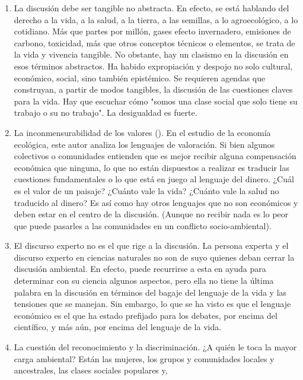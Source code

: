 \documentclass[
    a4paper,%
    DIV=calc,%
    abstract=true%
  ]{scrartcl}%
\begin{document}
  \begin{enumerate}
  \def\labelenumi{\arabic{enumi}.}
  \item
    La discusión debe ser tangible no abstracta. En efecto, se está
    hablando del derecho a la vida, a la salud, a la tierra, a las
    semillas, a lo agroecológico, a lo cotidiano. Más que partes por
    millón, gases efecto invernadero, emisiones de carbono, toxicidad,
    más que otros conceptos técnicos o elementos, se trata de la vida y
    vivencia tangible. No obstante, hay un clasismo en la discusión en
    esos términos abstractos. Ha habido expropiación y despojo no solo
    cultural, económico, social, sino también epistémico. Se requieren
    agendas que construyan, a partir de modos tangibles, la discusión de
    las cuestiones claves para la vida. Hay que escuchar cómo "somos una
    clase social que solo tiene su trabajo o su no trabajo". La
    desigualdad es fuerte.
  \item
    La inconmensurabilidad de los valores (). En el estudio de la economía ecológica, este autor
    analiza los lenguajes de valoración. Si bien algunos colectivos o
    comunidades entienden que es mejor recibir alguna compensación
    económica que ninguna, lo que no están dispuestos a realizar es
    traducir las cuestiones fundamentales o lo que está en juego al
    lenguaje del dinero. ¿Cuál es el valor de un paisaje? ¿Cuánto vale
    la vida? ¿Cuánto vale la salud no traducido al dinero? Es así como
    hay otros lenguajes que no son económicos y deben estar en el centro
    de la discusión. (Aunque no recibir nada es lo peor que puede
    pasarles a las comunidades en un conflicto socio-ambiental).
  \item
    El discurso experto no es el que rige a la discusión. La persona
    experta y el discurso experto en ciencias naturales no son de suyo
    quienes deban cerrar la discusión ambiental. En efecto, puede
    recurrirse a esta en ayuda para determinar con su ciencia algunos
    aspectos, pero ella no tiene la última palabra en la discusión en
    términos del bagaje del lenguaje de la vida y las tensiones que se
    manejan. Sin embargo, lo que se ha visto es que el lenguaje
    económico es el que ha estado prefijado para los debates, por encima
    del científico, y más aún, por encima del lenguaje de la vida.
  \item
    La cuestión del reconocimiento y la discriminación. ¿A quién le toca
    la mayor carga ambiental? Están las mujeres, los grupos y
    comunidades locales y ancestrales, las clases sociales populares y,

\end{enumerate}
\end{document}
